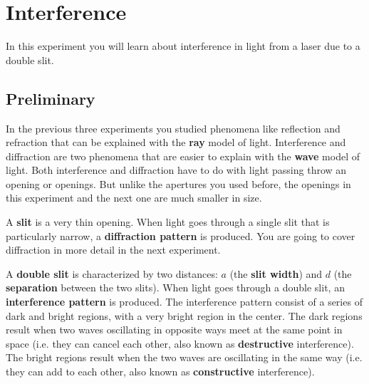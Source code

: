 \setcounter{chapter}{9}
\chapter{Interference}
%
In this experiment you will learn about interference in light from a laser due to a double slit.
%
\section{Preliminary}
%
In the previous three experiments you studied phenomena like reflection and refraction that can be explained with the \textbf{ray} model of light. Interference and diffraction are two phenomena that are easier to explain with the \textbf{wave} model of light. Both interference and diffraction have to do with light passing throw an opening or openings. But unlike the apertures you used before, the openings in this experiment and the next one are much smaller in size.

A \textbf{slit} is a very thin opening. When light goes through a single slit that is particularly narrow, a \textbf{diffraction pattern} is produced. You are going to cover diffraction in more detail in the next experiment.

A \textbf{double slit} is characterized by two distances: $a$ (the \textbf{slit width}) and $d$ (the \textbf{separation} between the two slits). When light goes through a double slit, an \textbf{interference pattern} is produced. The interference pattern consist of a series of dark and bright regions, with a very bright region in the center. The dark regions result when two waves oscillating in opposite ways meet at the same point in space (i.e. they can cancel each other, also known as \textbf{destructive} interference). The bright regions result when the two waves are oscillating in the same way (i.e. they can add to each other, also known as \textbf{constructive} interference).

